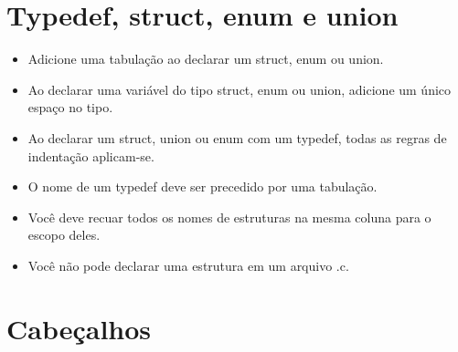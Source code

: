\documentclass{42-pt}
\begin{document}
    \section{Typedef, struct, enum e union}

        \begin{itemize}

            \item Adicione uma tabulação ao declarar um struct, enum ou union.

            \item Ao declarar uma variável do tipo struct, enum ou union,
                adicione um único espaço no tipo.

            \item Ao declarar um struct, union ou enum com um typedef,
                todas as regras de indentação aplicam-se.

            \item O nome de um typedef deve ser precedido por uma tabulação.

            \item Você deve recuar todos os nomes de estruturas na mesma coluna
                para o escopo deles.

            \item Você não pode declarar uma estrutura em um arquivo .c.

        \end{itemize}
        \newpage


    \section{Cabeçalhos}
\end{document}
